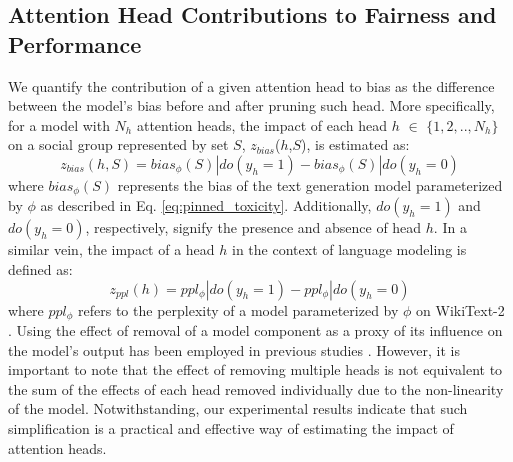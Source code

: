 \documentclass[letterpaper]{article} %
\newcommand{\goncalo}[1]
{\textcolor{orange}{{\bf}{\em #1}{\bf}}}
\begin{document}
\subsection{Attention Head Contributions to Fairness and Performance}
We quantify the contribution of a given attention head to bias as the difference between the model’s bias before and after pruning such head. More specifically, for a model with $N_h$ attention heads, the impact of each head $h$ $\in$ $\{1, 2, .., N_h\}$ on a social group represented by set $S$, $z_{bias}$($h$,$S$), is estimated as:
\begin{equation}
z_{bias}(h,S) = bias_{\phi}(S)|do(y_h = 1) - bias_{\phi}(S)|do(y_h = 0)
\label{eq:ATE_bias}
\end{equation} 
where $bias_{\phi}(S)$ represents the bias of the text generation model parameterized by $\phi$ as described in Eq. \eqref{eq:pinned_toxicity}. Additionally, $do(y_h = 1)$ and $do(y_h = 0)$, respectively, signify the presence and absence of head $h$.
In a similar vein, the impact of a head $h$ in the context of language modeling is defined as:
\begin{equation}
z_{ppl}(h) = ppl_{\phi}|do(y_h = 1) - ppl_{\phi}|do(y_h = 0)
\label{eq:ATE_perf}
\end{equation}
where $ppl_{\phi}$ refers to the perplexity of a model parameterized by $\phi$ on WikiText-2 \cite{meritypointer}. 
Using the effect of removal of a model component as a proxy of its influence on the model's output has been employed in previous studies \cite{rotman2021model}.
However, it is important to note that the effect of removing multiple heads is not equivalent to the sum of the effects of each head removed individually due to the non-linearity of the model. %
Notwithstanding, our experimental results indicate that such simplification is a practical and effective way of estimating the impact of attention heads. 


\end{document}
